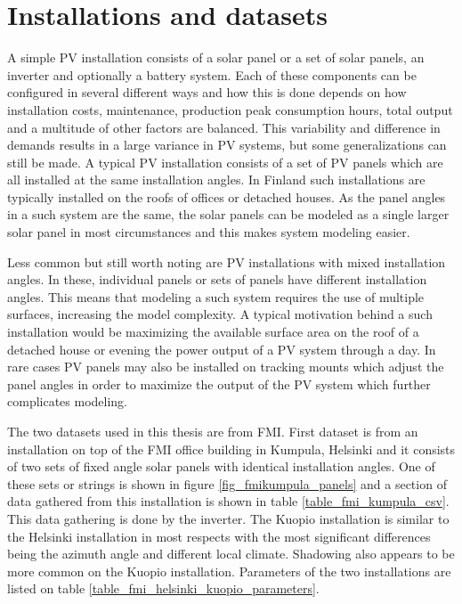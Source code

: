 \chapter{Installations and datasets}

\noindent A simple PV installation consists of a solar panel or a set of solar panels, an inverter and optionally a battery system. Each of these components can be configured in several different ways and how this is done depends on how installation costs, maintenance, production peak consumption hours, total output and a multitude of other factors are balanced. This variability and difference in demands results in a large variance in PV systems, but some generalizations can still be made. A typical PV installation consists of a set of PV panels which are all installed at the same installation angles. In Finland such installations are typically installed on the roofs of offices or detached houses. As the panel angles in a such system are the same, the solar panels can be modeled as a single larger solar panel in most circumstances and this makes system modeling easier.


Less common but still worth noting are PV installations with mixed installation angles. In these, individual panels or sets of panels have different installation angles. This means that modeling a such system requires the use of multiple surfaces, increasing the model complexity. A typical motivation behind a such installation would be maximizing the available surface area on the roof of a detached house or evening the power output of a PV system through a day. In rare cases PV panels may also be installed on tracking mounts which adjust the panel angles in order to maximize the output of the PV system which further complicates modeling.

The two datasets used in this thesis are from FMI. First dataset is from an installation on top of the FMI office building in Kumpula, Helsinki and it consists of two sets of fixed angle solar panels with identical installation angles. One of these sets or strings is shown in figure \ref{fig_fmikumpula_panels} and a section of data gathered from this installation is shown in table \ref{table_fmi_kumpula_csv}. This data gathering is done by the inverter. The Kuopio installation is similar to the Helsinki installation in most respects with the most significant differences being the azimuth angle and different local climate. Shadowing also appears to be more common on the Kuopio installation. Parameters of the two installations are listed on table \ref{table_fmi_helsinki_kuopio_parameters}.




